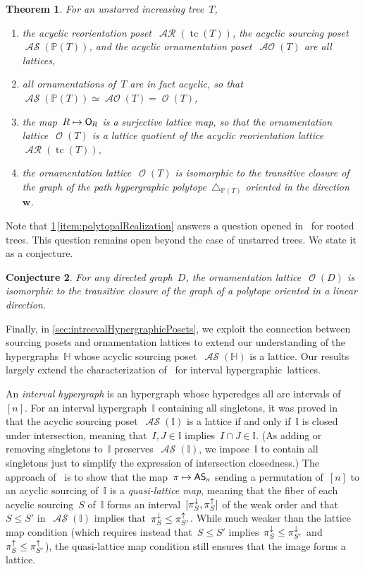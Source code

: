 \documentclass{amsart}
\newtheorem{theorem}{Theorem}[section]
\newtheorem{conjecture}[theorem]{Conjecture}
\theoremstyle{definition}
\renewcommand{\b}[1]{\boldsymbol{#1}} %
\renewcommand{\c}[1]{\mathcal{#1}} %
\newcommand{\simplex}{\triangle} %
\DeclareMathOperator{\tc}{tc} %
\newcommand{\darkblue}{\color{darkblue}} %
\newcommand{\defn}[1]{\textsl{\darkblue #1}} %
\newcommand{\projDown}[1]{\smash{\pi^\downarrow_{#1}}} %
\newcommand{\projUp}[1]{\smash{\pi^\uparrow_{#1}}} %
\newcommand{\mymap}[2]{\mathsf{#1}_{\hspace{-.7pt}#2}}
\DeclareMathOperator{\Orn}{\c{O}}  %
\newcommand{\orn}[1]{\mymap{O}{#1}}  %
\DeclareMathOperator{\AOrn}{\c{AO}}  %
\DeclareMathOperator{\AReori}{\c{AR}}  %
\DeclareMathOperator{\ASour}{\mathcal{AS}}  %
\newcommand{\asour}[1]{\mymap{AS}{#1}}  %
\newcommand{\HH}{\mathbb H}  %
\newcommand{\II}{\mathbb I} %
\newcommand{\PP}{\mathbb P} %
\begin{document}
\begin{theorem}
\label{thm:main2}
For an unstarred increasing tree~$T$,
\begin{enumerate}
\item the acyclic reorientation poset~$\AReori(\tc(T))$, the acyclic sourcing poset~$\ASour(\PP(T))$, and the acyclic ornamentation poset~$\AOrn(T)$ are all lattices,
\item all ornamentations of~$T$ are in fact acyclic, so that~$\ASour(\PP(T)) \simeq \AOrn(T) = \Orn(T)$,
\item the map~$R \mapsto \orn{R}$ is a surjective lattice map, so that the ornamentation lattice~$\Orn(T)$ is a lattice quotient of the acyclic reorientation lattice~$\AReori(\tc(T))$,
\item the ornamentation lattice~$\Orn(T)$ is isomorphic to the transitive closure of the graph of the path hypergraphic polytope~$\simplex_{\PP(T)}$ oriented in the direction~$\b{w}$. \label{item:polytopalRealization}
\end{enumerate}
\end{theorem}

Note that \cref{thm:main2}\,\eqref{item:polytopalRealization} answers a question opened in~\cite{DefantSack} for rooted trees.
This question remains open beyond the case of unstarred trees.
We state it as a conjecture.

\begin{conjecture}
For any directed graph~$D$, the ornamentation lattice~$\Orn(D)$ is isomorphic to the transitive closure of the graph of a polytope oriented in a linear direction.
\end{conjecture}

Finally, in \cref{sec:intreevalHypergraphicPosets}, we exploit the connection between sourcing posets and ornamentation lattices to extend our understanding of the hypergraphs~$\HH$ whose acyclic sourcing poset~$\ASour(\HH)$ is a lattice.
Our results largely extend the characterization of~\cite{BergeronPilaud} for interval hypergraphic~lattices.

An \defn{interval hypergraph} is an hypergraph whose hyperedges all are intervals of~$[n]$.
For an interval hypergraph~$\II$ containing all singletons, it was proved in~\cite[Thm.~A]{BergeronPilaud} that the acyclic sourcing poset~$\ASour(\II)$ is a lattice if and only if~$\II$ is closed under intersection, meaning that~$I,J \in \II$ implies~$I \cap J \in \II$.
(As adding or removing singletons to~$\II$ preserves~$\ASour(\II)$, we impose~$\II$ to contain all singletons just to simplify the expression of intersection closedness.)
The approach of~\cite{BergeronPilaud} is to show that the map~$\pi \mapsto \asour{\pi}$ sending a permutation of~$[n]$ to an acyclic sourcing of~$\II$ is a \defn{quasi-lattice map}, meaning that the fiber of each acyclic sourcing~$S$ of~$\II$ forms an interval~$[\projDown{S}, \projUp{S}]$ of the weak order and that~$S \le S'$ in~$\ASour(\II)$ implies that~$\projDown{S} \le \projUp{S'}$.
While much weaker than the lattice map condition (which requires instead that~$S \le S'$ implies~$\projDown{S} \le \projDown{S'}$ and~$\projUp{S} \le \projUp{S'}$), the quasi-lattice map condition still ensures that the image forms a lattice.
\end{document}
